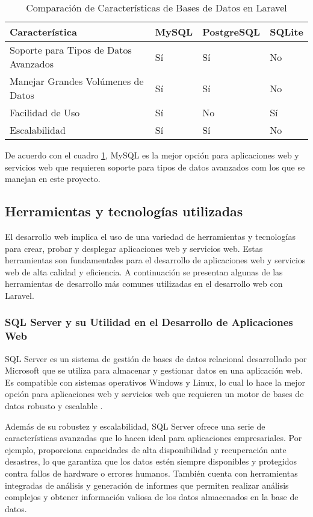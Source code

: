 \begin{table}[H]
\centering
\begin{tabular}{|l|l|l|l|}
\hline
\textbf{Característica} & \textbf{MySQL} & \textbf{PostgreSQL} & \textbf{SQLite} \\ \hline
Soporte para Tipos de Datos Avanzados & Sí & Sí & No \\ \hline
Manejar Grandes Volúmenes de Datos & Sí & Sí & No \\ \hline
Facilidad de Uso & Sí & No & Sí \\ \hline
Escalabilidad & Sí & Sí & No \\ \hline
\end{tabular}
\caption{Comparación de Características de Bases de Datos en Laravel}
\label{table:laravel_databases}
\end{table}

De acuerdo con el cuadro \ref{table:laravel_databases}, MySQL es la mejor opción para aplicaciones web y servicios web que requieren soporte para tipos de datos avanzados com los que se manejan en este proyecto.

\subsection{Herramientas y tecnologías utilizadas}
El desarrollo web implica el uso de una variedad de herramientas y tecnologías para crear, probar y desplegar aplicaciones web y servicios web. Estas herramientas son fundamentales para el desarrollo de aplicaciones web y servicios web de alta calidad y eficiencia. A continuación se presentan algunas de las herramientas de desarrollo más comunes utilizadas en el desarrollo web con Laravel. 

\subsubsection{SQL Server y su Utilidad en el Desarrollo de Aplicaciones Web}
SQL Server es un sistema de gestión de bases de datos relacional desarrollado por Microsoft que se utiliza para almacenar y gestionar datos en una aplicación web. Es compatible con sistemas operativos Windows y Linux, lo cual lo hace la mejor opción para aplicaciones web y servicios web que requieren un motor de bases de datos robusto y escalable \cite{sqlserver}.

Además de su robustez y escalabilidad, SQL Server ofrece una serie de características avanzadas que lo hacen ideal para aplicaciones empresariales. Por ejemplo, proporciona capacidades de alta disponibilidad y recuperación ante desastres, lo que garantiza que los datos estén siempre disponibles y protegidos contra fallos de hardware o errores humanos. También cuenta con herramientas integradas de análisis y generación de informes que permiten realizar análisis complejos y obtener información valiosa de los datos almacenados en la base de datos.


